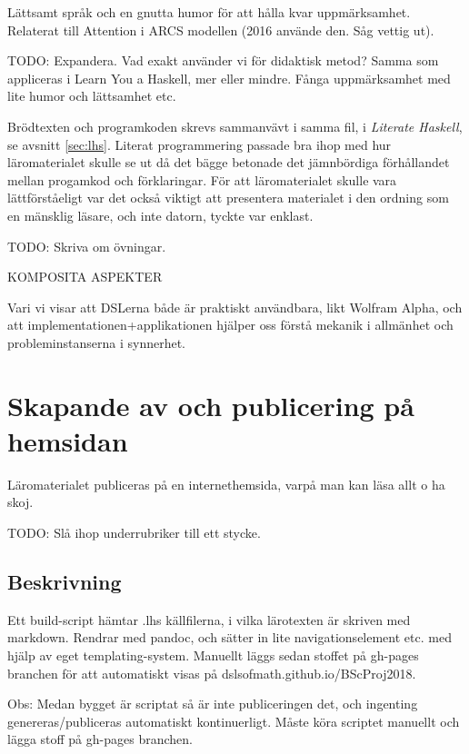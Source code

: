 \begin{binge}
Lättsamt språk och en gnutta humor för att hålla kvar
uppmärksamhet. Relaterat till Attention i ARCS modellen (2016
använde den. Såg vettig ut).

TODO: Expandera. Vad exakt använder vi för didaktisk metod? Samma
som appliceras i Learn You a Haskell, mer eller mindre. Fånga
uppmärksamhet med lite humor och lättsamhet etc.

Brödtexten och programkoden skrevs sammanvävt i samma fil, i \textit{Literate
Haskell}, se avsnitt \ref{sec:lhs}. Literat programmering passade bra ihop med
hur läromaterialet skulle se ut då det bägge betonade det jämnbördiga förhållandet
mellan progamkod och förklaringar. För att läromaterialet skulle vara
lättförståeligt var det också viktigt att presentera materialet i den ordning
som en mänsklig läsare, och inte datorn, tyckte var enklast.

TODO: Skriva om övningar. 

KOMPOSITA ASPEKTER

Vari vi visar att DSLerna både är praktiskt användbara, likt Wolfram
Alpha, och att implementationen+applikationen hjälper oss förstå
mekanik i allmänhet och probleminstanserna i synnerhet.

\section{Skapande av och publicering på hemsidan}

  Läromaterialet publiceras på en internethemsida, varpå man kan läsa
  allt o ha skoj.

  TODO: Slå ihop underrubriker till ett stycke.

  \subsection{Beskrivning}

  Ett build-script hämtar .lhs källfilerna, i vilka lärotexten är
  skriven med markdown. Rendrar med pandoc, och sätter in lite
  navigationselement etc. med hjälp av eget templating-system. Manuellt
  läggs sedan stoffet på gh-pages branchen för att automatiskt visas på
  dslsofmath.github.io/BScProj2018. 

  Obs: Medan bygget är scriptat så är inte publiceringen det, och
  ingenting genereras/publiceras automatiskt kontinuerligt. Måste köra
  scriptet manuellt och lägga stoff på gh-pages branchen.


\end{binge}
